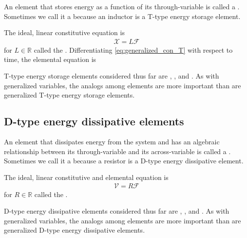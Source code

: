 \documentclass[dynamic_systems.tex]{subfiles}
\begin{document}
An element that stores energy as a function of its through-variable is called a .
Sometimes we call it a  because an inductor is a T-type energy storage element.

The ideal, linear constitutive equation is
\begin{align}\label{eq:generalized_con_T}
	\mathcal{X} = L \mathcal{F}
\end{align}
for $L\in\mathbb{R}$ called the .
Differentiating \autoref{eq:generalized_con_T} with respect to time, the elemental equation is

T-type energy storage elements considered thus far are , , and .
As with generalized variables, the analogs among elements are more important than are generalized T-type energy storage elements.

\subsection{D-type energy dissipative elements}

An element that dissipates energy from the system and has an algebraic relationship between its through-variable and its across-variable is called a .
Sometimes we call it a  because a resistor is a D-type energy dissipative element.

The ideal, linear constitutive and elemental equation is
\begin{align}\label{eq:generalized_con_D}
	\mathcal{V} = R \mathcal{F}
\end{align}
for $R\in\mathbb{R}$ called the .

D-type energy dissipative elements considered thus far are , , and .
As with generalized variables, the analogs among elements are more important than are generalized D-type energy dissipative elements.
\end{document}
